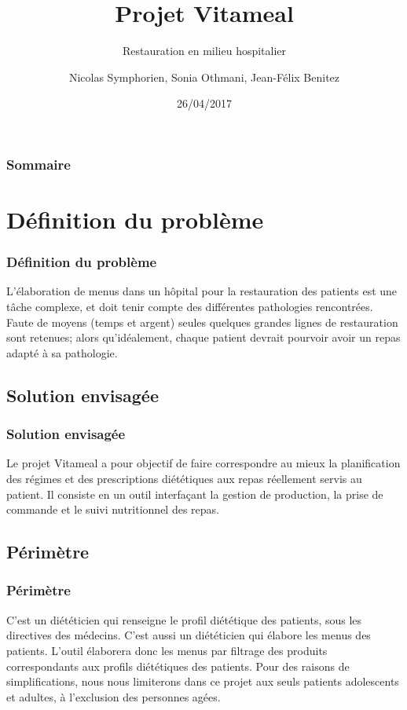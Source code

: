 \documentclass{beamer}
\title{Projet Vitameal}
\subtitle{Restauration en milieu hospitalier}
\author{Nicolas Symphorien, Sonia Othmani, Jean-Félix Benitez}
\institute{CNAM}
\date{26/04/2017}
\begin{document}
\begin{frame}[plain]
  \titlepage
\end{frame}

\begin{frame}
  \frametitle{Sommaire}
  \tableofcontents
\end{frame}

\section{Définition du problème}
\begin{frame}[label=definitionDuProbleme]
\frametitle{Définition du problème}
L'élaboration de menus dans un hôpital pour la restauration des patients
est une tâche complexe, et doit tenir compte des différentes pathologies
rencontrées. Faute de moyens (temps et argent) seules quelques grandes
lignes de restauration sont retenues; alors qu'idéalement, chaque
patient devrait pourvoir avoir un repas adapté à sa pathologie.
\end{frame}

\subsection{Solution envisagée}
\begin{frame}[label=solutionEnvisagée]
\frametitle{Solution envisagée}
Le projet Vitameal a pour objectif de faire correspondre au mieux la planification des régimes et des
prescriptions diététiques aux repas réellement servis au patient. Il consiste en un outil interfaçant la
gestion de production, la prise de commande et le suivi nutritionnel des repas.
\end{frame}

\subsection{Périmètre}
\begin{frame}[label=perimetre]
\frametitle{Périmètre}
C'est un diététicien qui renseigne le profil diététique des patients,
sous les directives des médecins. C'est aussi un diététicien qui élabore
les menus des patients. L'outil élaborera donc
les menus par filtrage des produits correspondants aux profils
diététiques des patients. Pour des raisons de simplifications, nous nous limiterons dans ce projet aux seuls patients adolescents et adultes, à l'exclusion des personnes agées.
\end{frame}
\end{document}
